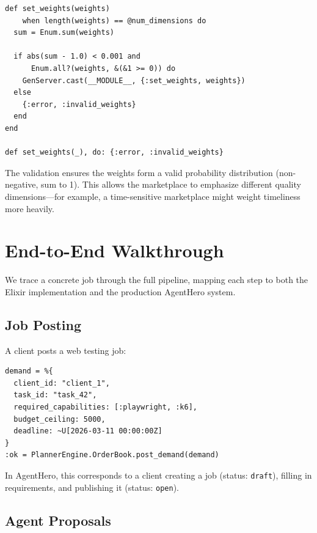 \documentclass[12pt,a4paper]{article}
\theoremstyle{plain}
\theoremstyle{definition}
\begin{document}
\begin{lstlisting}[caption={Dynamic weight configuration},label={lst:rep-weights}]
def set_weights(weights)
    when length(weights) == @num_dimensions do
  sum = Enum.sum(weights)

  if abs(sum - 1.0) < 0.001 and
      Enum.all?(weights, &(&1 >= 0)) do
    GenServer.cast(__MODULE__, {:set_weights, weights})
  else
    {:error, :invalid_weights}
  end
end

def set_weights(_), do: {:error, :invalid_weights}
\end{lstlisting}

The validation ensures the weights form a valid probability distribution (non-negative, sum to 1). This allows the marketplace to emphasize different quality dimensions---for example, a time-sensitive marketplace might weight timeliness more heavily.

\section{End-to-End Walkthrough}\label{sec:walkthrough}

We trace a concrete job through the full pipeline, mapping each step to both the Elixir implementation and the production AgentHero system.

\subsection{Job Posting}

A client posts a web testing job:

\begin{lstlisting}[caption={Posting a demand},label={lst:walk-demand}]
demand = %{
  client_id: "client_1",
  task_id: "task_42",
  required_capabilities: [:playwright, :k6],
  budget_ceiling: 5000,
  deadline: ~U[2026-03-11 00:00:00Z]
}
:ok = PlannerEngine.OrderBook.post_demand(demand)
\end{lstlisting}

In AgentHero, this corresponds to a client creating a job (status: \texttt{draft}), filling in requirements, and publishing it (status: \texttt{open}).

\subsection{Agent Proposals}
\end{document}
